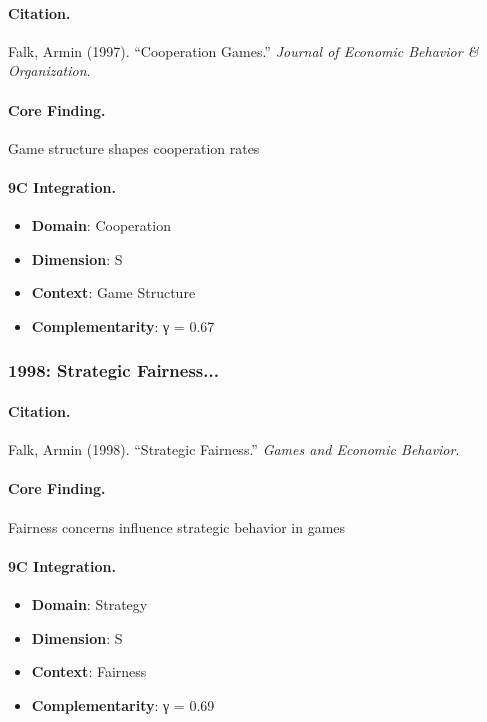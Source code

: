 \paragraph{Citation.}
Falk, Armin (1997). ``Cooperation Games.''
\textit{Journal of Economic Behavior & Organization}.

\paragraph{Core Finding.}
Game structure shapes cooperation rates

\paragraph{9C Integration.}
\begin{itemize}[nosep]
  \item \textbf{Domain}: Cooperation
  \item \textbf{Dimension}: S
  \item \textbf{Context}: Game Structure
  \item \textbf{Complementarity}: γ = 0.67
\end{itemize}


\subsubsection{1998: Strategic Fairness...}

\paragraph{Citation.}
Falk, Armin (1998). ``Strategic Fairness.''
\textit{Games and Economic Behavior}.

\paragraph{Core Finding.}
Fairness concerns influence strategic behavior in games

\paragraph{9C Integration.}
\begin{itemize}[nosep]
  \item \textbf{Domain}: Strategy
  \item \textbf{Dimension}: S
  \item \textbf{Context}: Fairness
  \item \textbf{Complementarity}: γ = 0.69
\end{itemize}



